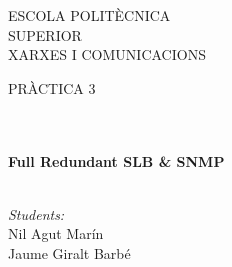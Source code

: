 \documentclass[10pt]{article}
\begin{document}
\begin{center}
\begin{minipage}{0.48\textwidth}
\begin{flushright}
\end{flushright}\end{minipage}

\vspace*{-1.5cm}                                %
\textsc{\huge ESCOLA POLIT\` ECNICA \\ \vspace{5px}SUPERIOR}\\[1.5cm] 

\textsc{\LARGE XARXES I COMUNICACIONS}\\[1.5cm]                                                   %

\begin{minipage}{0.9\textwidth} 
\begin{center}                                                                                  %
\textsc{\LARGE PR\`ACTICA 3}
\end{center}
\end{minipage}\\[0.5cm]
            \vspace*{1cm}                                                                       %
\HRule \\[0.4cm]                                                                    %
{ \huge \bfseries Full Redundant SLB \& SNMP}\\[0.4cm]  %
\HRule \\[1.5cm]                                                                    %
\begin{minipage}{0.46\textwidth}                                                    %
\begin{flushleft} \large                                                            %
\emph{Students:}\\   
Nil Agut Marín\\
Jaume Giralt Barbé

\end{flushleft}
\end{minipage}
\end{center}
\end{document}
